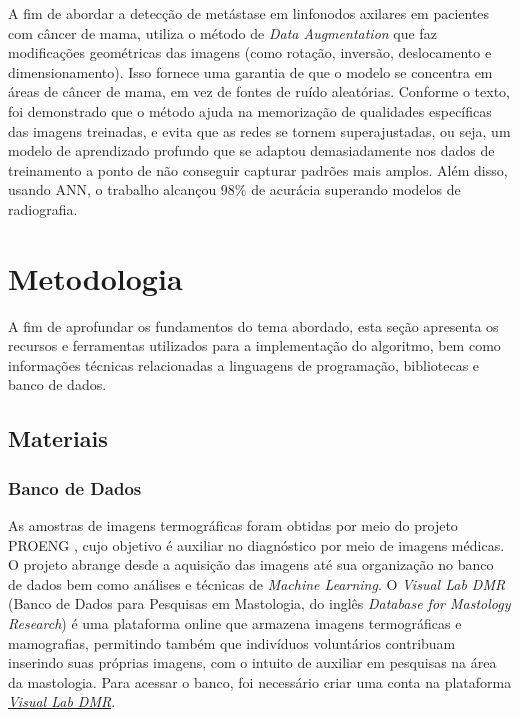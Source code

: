 A fim de abordar a detecção de metástase em linfonodos axilares em pacientes com câncer de mama,  utiliza o método de \textit{Data Augmentation} que faz modificações geométricas das imagens (como rotação, inversão, deslocamento e dimensionamento). Isso fornece uma garantia de que o modelo se concentra em áreas de câncer de mama, em vez de fontes de ruído aleatórias. Conforme o texto, foi demonstrado que o método ajuda na memorização de qualidades específicas das imagens treinadas, e evita que as redes se tornem superajustadas, ou seja, um modelo de aprendizado profundo que se adaptou demasiadamente nos dados de treinamento a ponto de não conseguir capturar padrões mais amplos. Além disso, usando ANN, o trabalho alcançou 98\% de acurácia superando modelos de radiografia.




\section{\esp Metodologia} \label{metodologia}
A fim de aprofundar os fundamentos do tema abordado, esta seção apresenta os recursos e ferramentas utilizados para a implementação do algoritmo, bem como informações técnicas relacionadas a linguagens de programação, bibliotecas e banco de dados.



\subsection{\esp Materiais} \label{materiais}


\subsubsection{\esp Banco de Dados} \label{database}

As amostras de imagens termográficas foram obtidas por meio do projeto PROENG , cujo objetivo é auxiliar no diagnóstico por meio de imagens médicas. O projeto abrange desde a aquisição das imagens até sua organização no banco de dados bem como análises e técnicas de \textit{Machine Learning}. O \textit{Visual Lab DMR} (Banco de Dados para Pesquisas em Mastologia, do inglês \textit{Database for Mastology Research}) é uma plataforma online que armazena imagens termográficas e mamografias, permitindo também que indivíduos voluntários contribuam inserindo suas próprias imagens, com o intuito de auxiliar em pesquisas na área da mastologia. Para acessar o banco, foi necessário criar uma conta na plataforma \href{http://visual.ic.uff.br/dmi}{\textit{Visual Lab DMR}}. 

